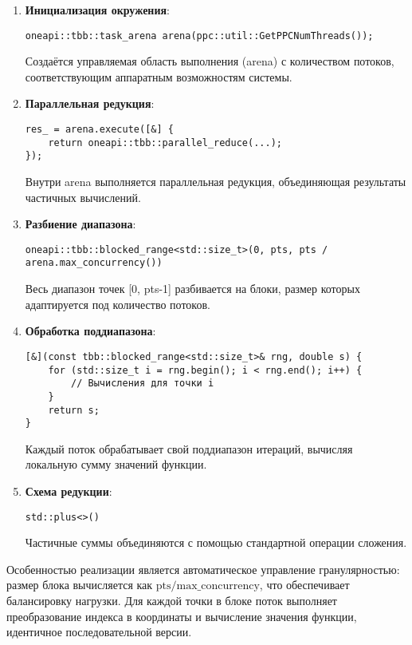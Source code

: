 \documentclass[12pt,a4paper]{extarticle}
\begin{document}
\begin{enumerate}
    \item \textbf{Инициализация окружения}:
    \begin{verbatim}
oneapi::tbb::task_arena arena(ppc::util::GetPPCNumThreads());
    \end{verbatim}
    Создаётся управляемая область выполнения (arena) с количеством потоков, соответствующим аппаратным возможностям системы.
    
    \item \textbf{Параллельная редукция}:
    \begin{verbatim}
res_ = arena.execute([&] {
    return oneapi::tbb::parallel_reduce(...);
});
    \end{verbatim}
    Внутри arena выполняется параллельная редукция, объединяющая результаты частичных вычислений.
    
    \item \textbf{Разбиение диапазона}:
    \begin{verbatim}
oneapi::tbb::blocked_range<std::size_t>(0, pts, pts / arena.max_concurrency())
    \end{verbatim}
    Весь диапазон точек [0, pts-1] разбивается на блоки, размер которых адаптируется под количество потоков.
    
    \item \textbf{Обработка поддиапазона}:
    \begin{verbatim}
[&](const tbb::blocked_range<std::size_t>& rng, double s) {
    for (std::size_t i = rng.begin(); i < rng.end(); i++) {
        // Вычисления для точки i
    }
    return s;
}
    \end{verbatim}
    Каждый поток обрабатывает свой поддиапазон итераций, вычисляя локальную сумму значений функции.
    
    \item \textbf{Схема редукции}:
    \begin{verbatim}
std::plus<>()
    \end{verbatim}
    Частичные суммы объединяются с помощью стандартной операции сложения.
\end{enumerate}

Особенностью реализации является автоматическое управление гранулярностью: размер блока вычисляется как $\text{pts} / \text{max\_concurrency}$, что обеспечивает балансировку нагрузки. Для каждой точки в блоке поток выполняет преобразование индекса в координаты и вычисление значения функции, идентичное последовательной версии.
\end{document}
